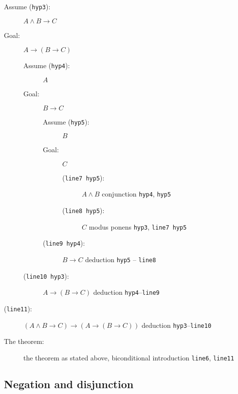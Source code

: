 \documentclass[12pt]{article}
\begin{document}
\begin{description}
\begin{description}
\item[Assume ({\tt hyp3}):]  $A \wedge B \rightarrow C$

\item[Goal:]  $A \rightarrow (B \rightarrow C)$

\begin{description}

\item[Assume ({\tt hyp4}):]  $A$

\item[Goal:]  $B \rightarrow C$

\begin{description}

\item[Assume ({\tt hyp5}):]  $B$

\item[Goal:]  $C$
\begin{description}
\item[({\tt line7 hyp5}):]  $A \wedge B$  conjunction {\tt hyp4}, {\tt hyp5}

\item[({\tt line8 hyp5}):] $C$ modus ponens {\tt hyp3}, {\tt line7 hyp5}
\end{description}
\item [({\tt line9 hyp4}):] $B \rightarrow C$ deduction {\tt hyp5} -- {\tt line8}

\end{description}

\item[({\tt line10 hyp3}):] $A \rightarrow (B \rightarrow C)$  deduction {\tt hyp4}--{\tt line9}

\end{description}

\item[({\tt line11}):]  $(A \wedge B \rightarrow C)\rightarrow (A \rightarrow (B \rightarrow C))$  deduction {\tt hyp3}--{\tt line10}

\item[The theorem:]  the theorem as stated above, biconditional introduction {\tt line6}, {\tt line11}

\end{description}



\end{description}


\newpage

\subsection{Negation and disjunction}
\end{document}
